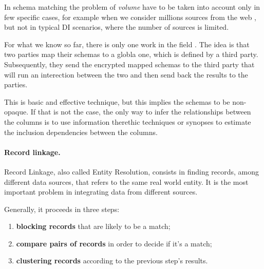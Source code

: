 \documentclass[12pt]{article}
\begin{document}
In schema matching the problem of \textit{volume} have to be taken into account only in few specific cases, for example when we consider millions sources from the web \cite*{Pimplikar2012}, but not in typical DI scenarios, 
where the number of sources is limited.

For what we know so far, there is only one work in the field \cite{scannapieco_privacy_2007}. The idea is that two parties map their schemas to a globla one, which is defined by a third party. Subsequently, they send the encrypted mapped schemas to the third party that will run an interection between the two and then send back the results to the parties. 

This is basic and effective technique, but this implies the schemas to be non-opaque. If that is not the case, the only way to infer the relationships between the columns is to use information therethic techniques or synopses to estimate the inclusion dependencies between the columns. 




\paragraph{Record linkage.}
Record Linkage, also called Entity Resolution, consists in finding records, among different data sources, that refers to the same real world entity. 
It is the most important problem in integrating data from different sources. 

Generally, it proceeds in three steps: 
\begin{enumerate}
   \item \textbf{blocking records} that are likely to be a match;
   \item \textbf{compare pairs of records} in order to decide if it's a match;
   \item \textbf{clustering records} according to the previous step's results.
\end{enumerate}
\end{document}
